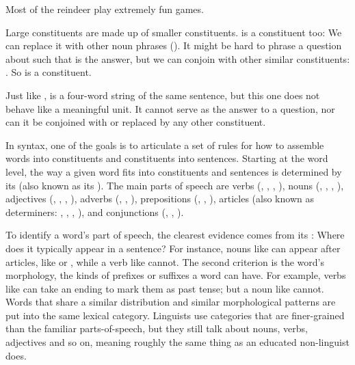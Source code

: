 \ea \label{ex:reindeer} Most of the reindeer play extremely fun games.
\z 


Large constituents are made up of smaller constituents.   is a constituent too: We can replace it with other noun phrases ().  It might be hard to phrase a question about  such that  is the answer, but we can conjoin  with other similar constituents: .  So  is a constituent.

Just like ,  is a four-word string of the same sentence, but this one does not behave like a meaningful unit.  It cannot serve as the answer to a question, nor can it be conjoined with or replaced by any other constituent.

In syntax, one of the goals is to articulate a set of rules for how to assemble words into constituents and constituents into sentences.  Starting at the word level, the way a given word fits into constituents and sentences is determined by its  (also known as its ).  The main parts of speech are verbs
(, , , ), nouns
(, , , ), adjectives
(, , , ), adverbs
(, , ), prepositions
(, , ), articles (also known as determiners: ,
, , ), and conjunctions
(, , ).


\label{part:of:speech}
To identify a word's part of speech, the clearest evidence comes from its : Where does it typically appear in a sentence?  For instance, nouns like  can appear after articles, like  or , while a verb like  cannot. The second criterion is the word's morphology, the kinds of  prefixes or suffixes a word can have.  For example, verbs like  can take an  ending to mark them as past tense; but a noun like  cannot.  Words that share a similar distribution and similar morphological patterns are put into the same lexical category. Linguists use categories that are finer-grained than the familiar parts-of-speech, but they still talk about nouns, verbs, adjectives and so on, meaning roughly the same thing as an educated non-linguist does.  

